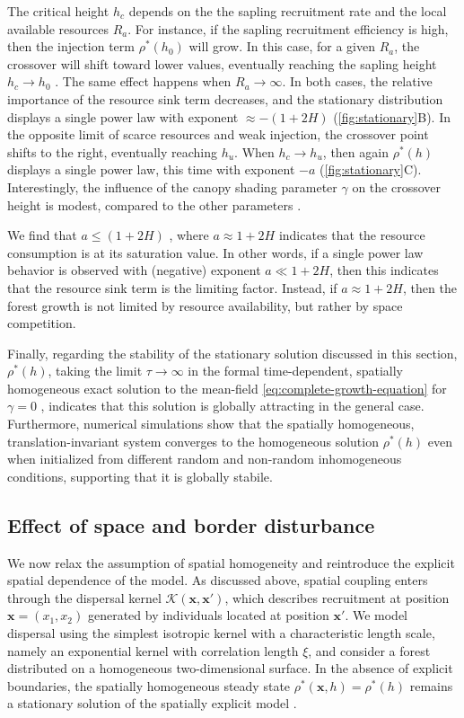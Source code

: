 \documentclass[aps,pre,twocolumn,superscriptaddress,10pt]{revtex4-2}
\begin{document}
The critical height $h_c$ depends on the the sapling recruitment rate and the local available resources $R_a$. For instance, if the sapling recruitment efficiency is high, then the injection term $\rho^*(h_0)$ will grow. In this case, for a given $R_a$, the crossover will shift toward lower values, eventually reaching the sapling height $h_c \to h_0$ \SInoref.  The same effect happens when $R_a\to\infty$. In both cases, the relative importance of the resource sink term decreases, and the stationary distribution displays a single power law with exponent $\approx -(1+2H)$ (\cref{fig:stationary}B). In the opposite limit of scarce resources and weak injection, the crossover point shifts to the right, eventually reaching $h_u$. When $h_c\to h_u$, then again $\rho^*(h)$ displays a single power law, this time with exponent $-a$ (\cref{fig:stationary}C). Interestingly, the influence of the canopy shading parameter $\gamma$ on the  crossover height is modest, compared to the other parameters \SInoref. 

We find that $a\leq (1+2H)$ \MMnoref, where $a\approx 1 + 2H$ indicates that the resource consumption is at its saturation value. In other words, if a single power law behavior is observed with (negative) exponent $a\ll1+2H$, then this indicates that the resource sink term is the limiting factor. Instead, if $a\approx1+2H$, then the forest growth is not limited by resource availability, but rather by space competition. 

Finally, regarding the stability of  the stationary solution discussed in this section, $\rho^*(h)$, taking the limit $\tau \to \infty$ in the formal time-dependent, spatially homogeneous exact solution to the mean-field \cref{eq:complete-growth-equation} for $\gamma=0$ \SInoref, indicates that this solution is globally attracting in the general case. Furthermore, numerical simulations show that the spatially homogeneous, translation-invariant system converges to the homogeneous solution $\rho^*(h)$ even when initialized from different random and non-random inhomogeneous conditions, supporting that it is globally stabile.


\subsection*{Effect of space and border disturbance}
We now relax the assumption of spatial homogeneity and reintroduce the explicit spatial dependence of the model. As discussed above, spatial coupling enters through the dispersal kernel $\mathcal K(\mathbf{x},\mathbf{x}')$, which describes recruitment at position $\mathbf{x}=(x_1,x_2)$ generated by individuals located at position $\mathbf{x}'$. We model dispersal using the simplest isotropic kernel with a characteristic length scale, namely an exponential kernel with correlation length $\xi$, and consider a forest distributed on a homogeneous two-dimensional surface. In the absence of explicit boundaries, the spatially homogeneous steady state $\rho^*(\mathbf{x},h)=\rho^*(h)$ remains a stationary solution of the spatially explicit model \MMnoref.
\end{document}
